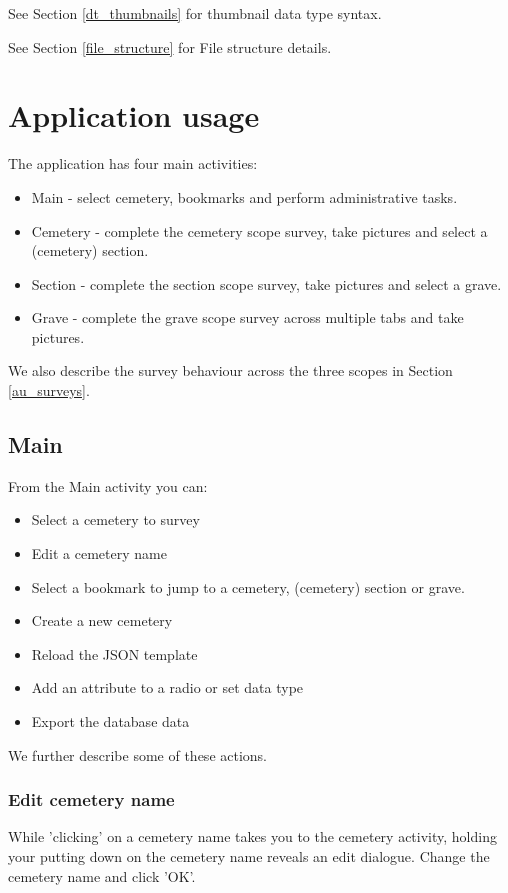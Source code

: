 \documentclass{scrreprt}
\begin{document}
See Section \ref{dt_thumbnails} for thumbnail data type syntax.

See Section \ref{file_structure} for File structure details.

\chapter{Application usage}
The application has four main activities:
\begin{itemize}
\item Main - select cemetery, bookmarks and perform administrative tasks.
\item Cemetery - complete the cemetery scope survey, take pictures and select a (cemetery) section.
\item Section - complete the section scope survey, take pictures and select a grave.
\item Grave - complete the grave scope survey across multiple tabs and take pictures.
\end{itemize}

We also describe the survey behaviour across the three scopes in Section \ref{au_surveys}.

\section{Main}
From the Main activity you can:
\begin{itemize}
\item Select a cemetery to survey
\item Edit a cemetery name
\item Select a bookmark to jump to a cemetery, (cemetery) section or grave.
\item Create a new cemetery
\item Reload the JSON template
\item Add an attribute to a radio or set data type
\item Export the database data
\end{itemize}

We further describe some of these actions.

\subsection{Edit cemetery name}
While 'clicking' on a cemetery name takes you to the cemetery activity, holding your putting down on the cemetery name reveals an edit dialogue. Change the cemetery name and click 'OK'.
\end{document}
